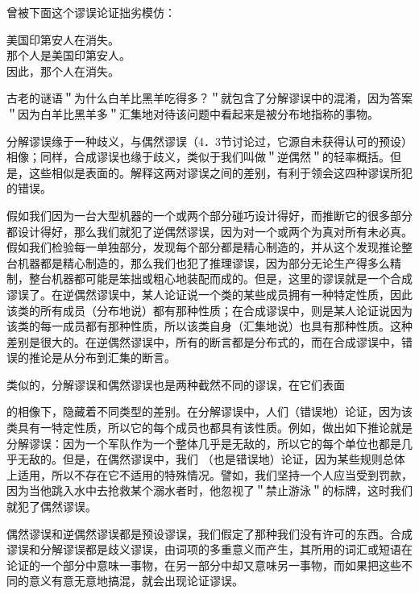 曾被下面这个谬误论证拙劣模仿：

美国印第安人在消失。\\
那个人是美国印第安人。\\
因此，那个人在消失。

古老的谜语＂为什么白羊比黑羊吃得多？＂就包含了分解谬误中的混淆，因为答案＂因为白羊比黑羊多＂汇集地对待该问题中看起来是被分布地指称的事物。

分解谬误缘于一种歧义，与偶然谬误（4．3节讨论过，它源自未获得认可的预设）相像；同样，合成谬误也缘于歧义，类似于我们叫做＂逆偶然＂的轻率概括。但是，这些相似是表面的。解释这两对谬误之间的差别，有利于领会这四种谬误所犯的错误。

假如我们因为一台大型机器的一个或两个部分碰巧设计得好，而推断它的很多部分都设计得好，那么我们就犯了逆偶然谬误，因为对一个或两个为真对所有未必真。假如我们检验每一单独部分，发现每个部分都是精心制造的，并从这个发现推论整台机器都是精心制造的，那么我们也犯了推理谬误，因为部分无论生产得多么精制，整台机器都可能是笨拙或粗心地装配而成的。但是，这里的谬误就是一个合成谬误了。在逆偶然谬误中，某人论证说一个类的某些成员拥有一种特定性质，因此该类的所有成员（分布地说）都有那种性质；在合成谬误中，则是某人论证说因为该类的每一成员都有那种性质，所以该类自身（汇集地说）也具有那种性质。这种差别是很大的。在逆偶然谬误中，所有的断言都是分布式的，而在合成谬误中，错误的推论是从分布到汇集的断言。

类似的，分解谬误和偶然谬误也是两种截然不同的谬误，在它们表面

的相像下，隐藏着不同类型的差别。在分解谬误中，人们（错误地）论证，因为该类具有一特定性质，所以它的每个成员也都具有该性质。例如，做出如下推论就是分解谬误：因为一个军队作为一个整体几乎是无敌的，所以它的每个单位也都是几乎无敌的。但是，在偶然谬误中，我们 （也是错误地）论证，因为某些规则总体上适用，所以不存在它不适用的特殊情况。譬如，我们坚持一个人应当受到罚款，因为当他跳入水中去抢救某个溺水者时，他忽视了＂禁止游泳＂的标牌，这时我们就犯了偶然谬误。

偶然谬误和逆偶然谬误都是预设谬误，我们假定了那种我们没有许可的东西。合成谬误和分解谬误都是歧义谬误，由词项的多重意义而产生，其所用的词汇或短语在论证的一个部分中意味一事物，在另一部分中却又意味另一事物，而如果把这些不同的意义有意无意地搞混，就会出现论证谬误。

